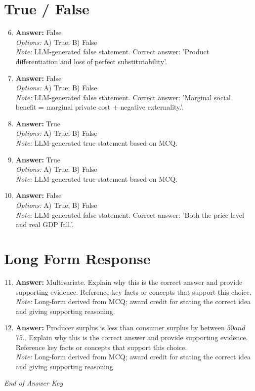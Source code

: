 \documentclass[12pt]{article}
\begin{document}
\section*{True / False}
\begin{enumerate}[label=\arabic*.]
\setcounter{enumi}{5}
\item \textbf{Answer:} False
\\ \textit{Options:} A) True; B) False
\\ \textit{Note:} LLM-generated false statement. Correct answer: 'Product differentiation and loss of perfect substitutability'.
\item \textbf{Answer:} False
\\ \textit{Options:} A) True; B) False
\\ \textit{Note:} LLM-generated false statement. Correct answer: 'Marginal social benefit = marginal private cost + negative externality.'.
\item \textbf{Answer:} True
\\ \textit{Options:} A) True; B) False
\\ \textit{Note:} LLM-generated true statement based on MCQ.
\item \textbf{Answer:} True
\\ \textit{Options:} A) True; B) False
\\ \textit{Note:} LLM-generated true statement based on MCQ.
\item \textbf{Answer:} False
\\ \textit{Options:} A) True; B) False
\\ \textit{Note:} LLM-generated false statement. Correct answer: 'Both the price level and real GDP fall.'.
\end{enumerate}

\section*{Long Form Response}
\begin{enumerate}[label=\arabic*.]
\setcounter{enumi}{10}
\item \textbf{Answer:} Multivariate. Explain why this is the correct answer and provide supporting evidence. Reference key facts or concepts that support this choice.
\\ \textit{Note:} Long-form derived from MCQ; award credit for stating the correct idea and giving supporting reasoning.
\item \textbf{Answer:} Producer surplus is less than consumer surplus by between $50 and $75.. Explain why this is the correct answer and provide supporting evidence. Reference key facts or concepts that support this choice.
\\ \textit{Note:} Long-form derived from MCQ; award credit for stating the correct idea and giving supporting reasoning.
\end{enumerate}

\vfill
\noindent\textit{End of Answer Key}
\end{document}
